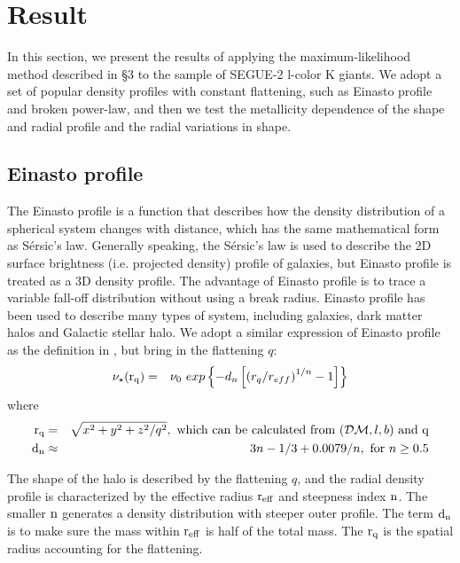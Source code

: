 \documentclass[12pt,preprint]{aastex}
\newcommand{\DM}{\mathcal{DM}}
\begin{document}
\section{Result}
In this section, we present the results of applying the maximum-likelihood method described in \S 3 to the sample of SEGUE-2 l-color K giants. We adopt a set of popular density profiles with constant flattening, such as Einasto profile and broken power-law, and then we test the metallicity dependence of the shape and radial profile and the radial variations in shape.
\subsection{Einasto profile}
The Einasto profile\citep{Einasto1989} is a function that describes how the density distribution of a spherical system changes with distance, which has the same mathematical form as S{\'e}rsic's law\citep{Sersic1963}. Generally speaking, the S{\'e}rsic's law is used to describe the 2D surface brightness (i.e. projected density) profile of galaxies, but Einasto profile is treated as a 3D density profile. The advantage of Einasto profile is to trace a variable fall-off distribution without using a break radius. Einasto profile has been used to describe many types of system, including galaxies\citep{Einasto1989}, dark matter halos\citep{Merritt2006,Graham2006,Navarro2010} and Galactic stellar halo\citep{Sesar2011,Deason2011}. We adopt a similar expression of Einasto profile as the definition in \citet{Merritt2006}, but bring in the flattening $q$:
\begin{eqnarray}
\rm \nu_{\star}(r_q) &=& \nu_0~exp\left\{-d_n\left[\left(r_q/r_{eff}\right )^{1/n}-1\right ]\right\}
 \end{eqnarray}
where 
\begin{eqnarray*}
\rm r_q &=& \sqrt{x^2+y^2+z^2/q^2}, \mbox{ which can be calculated from $\left(\DM,l,b \right)$ and q}   \nonumber \\ 
\rm d_n &\approx& 3n-1/3+0.0079/n,  \mbox{ for } n \ge 0.5 \nonumber 
\end{eqnarray*}

The shape of the halo is described by the flattening $q$, and the radial density profile is characterized by the effective radius $\rm r_{eff}$ and steepness index $\rm n$. The smaller $\rm n$ generates a density distribution with steeper outer profile. The term $\rm d_n$ is to make sure the mass within $\rm r_{eff}$ is half of the total mass. The $\rm r_q$ is the spatial radius accounting for the flattening. 
\end{document}
